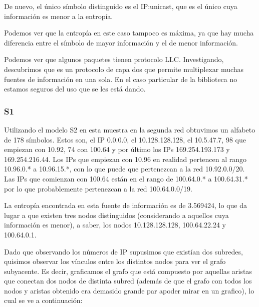 De nuevo, el único símbolo distinguido es el IP:unicast, que es el único cuya
información es menor a la entropía.

Podemos ver que la entropía en este caso tampoco es máxima, ya que hay mucha 
diferencia entre el símbolo de mayor información y el de menor información.

Podemos ver que algunos paquetes tienen protocolo LLC. Investigando, descubrimos
que es un protocolo de capa dos que permite multiplexar muchas fuentes de
información en una sola. En el caso particular de la biblioteca no
estamos seguros del uso que se les está dando.

\subsubsection{S1}

Utilizando el modelo S2 en esta muestra en la segunda red obtuvimos un
alfabeto de 178 símbolos. Estos son, el IP 0.0.0.0, el 10.128.128.128,
el 10.5.47.7, 98 que empiezan con 10.92, 74 con 100.64 y por último
los IPs 169.254.193.173 y 169.254.216.44. Los IPs que empiezan con
10.96 en realidad pertencen al rango 10.96.0.* a 10.96.15.*, con lo
que puede que pertenezcan a la red 10.92.0.0/20. Las IPs que comienzan
con 100.64 están en el rango de 100.64.0.* a 100.64.31.* por lo que
probablemente pertenezcan a la red 100.64.0.0/19.

La entropía encontrada en esta fuente de información es de 3.569424,
lo que da lugar a que existen tres nodos distinguidos (considerando a
aquellos cuya información es menor), a saber, los nodos
10.128.128.128, 100.64.22.24 y 100.64.0.1.

Dado que observando los números de IP supusimos que existían dos
subredes, quisimos observar los vínculos entre los distintos nodos
para ver el grafo subyacente. Es decir, graficamos el grafo que está
compuesto por aquellas aristas que conectan dos nodos de distinta
subred (además de que el grafo con todos los nodos y aristas obtenido
era demasido grande par apoder mirar en un grafico), lo cual se ve a
continuación:

